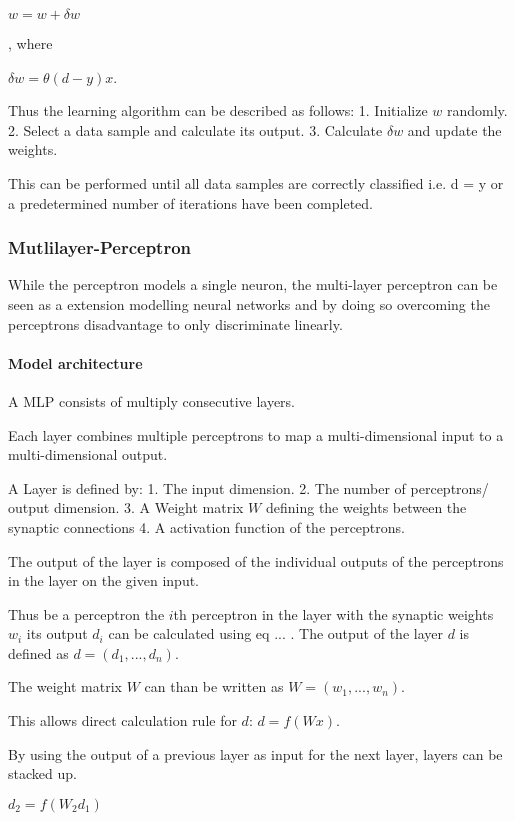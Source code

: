 $w = w + \delta w$

, where 

$\delta w = \theta (d-y) x $.

Thus the learning algorithm can be described as follows:
1. Initialize $w$ randomly.
2. Select a data sample and calculate its output.
3. Calculate $\delta w$ and update the weights.

This can be performed until all data samples are correctly classified i.e. d = y or a predetermined number of iterations have been completed. 


\subsubsection{Mutlilayer-Perceptron}

While the perceptron models a single neuron, the multi-layer perceptron can be seen as a extension modelling neural networks and by doing so overcoming the perceptrons disadvantage to only discriminate linearly. 

\paragraph{Model architecture}

A MLP consists of multiply consecutive layers.

Each layer combines multiple perceptrons to map a multi-dimensional input to a multi-dimensional output.

A Layer is defined by:
1. The input dimension.
2. The number of perceptrons/ output dimension.
3. A Weight matrix $W$ defining the weights between the synaptic connections
4. A activation function of the perceptrons.


The output of the layer is composed of the individual outputs of the perceptrons in the layer on the given input.

Thus be a perceptron the $i$th perceptron in the layer with the synaptic weights $w_i$ its output $d_i$ can be calculated using eq ... . 
The output of the layer $d$ is defined as $d = (d_1, ... ,d_n)$. 

The weight matrix $W$ can than be written as $W = (w_1, ... ,w_n)$. 

This allows direct calculation rule for $d$: $d = f (W x ) $.

By using the output of a previous layer as input for the next layer, layers can be stacked up. 

$d_2 = f (W_2 d_1)$

